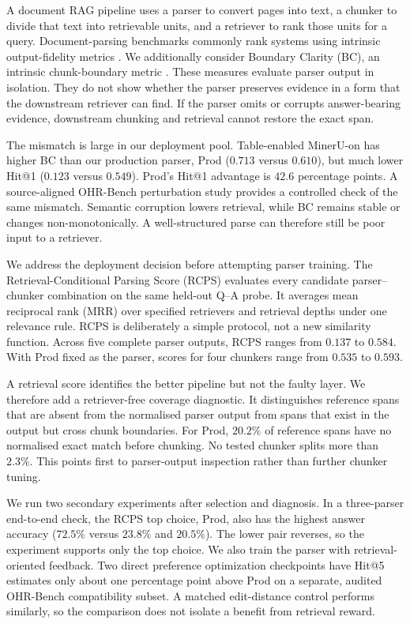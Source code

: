 \documentclass[11pt]{article}
\newcommand{\rcps}{\textnormal{\textsc{RCPS}}}
\begin{document}
A document RAG pipeline uses a parser to convert pages into text, a chunker to divide that text into retrievable units, and a retriever to rank those units for a query. Document-parsing benchmarks commonly rank systems using intrinsic output-fidelity metrics \citep{ouyang2025omnidocbench}. We additionally consider Boundary Clarity (BC), an intrinsic chunk-boundary metric \citep{zhao2025moc}. These measures evaluate parser output in isolation. They do not show whether the parser preserves evidence in a form that the downstream retriever can find. If the parser omits or corrupts answer-bearing evidence, downstream chunking and retrieval cannot restore the exact span.

The mismatch is large in our deployment pool. Table-enabled MinerU-on \citep{mineru2025} has higher BC than our production parser, Prod ($0.713$ versus $0.610$), but much lower Hit@1 ($0.123$ versus $0.549$). Prod's Hit@1 advantage is $42.6$ percentage points. A source-aligned OHR-Bench perturbation study \citep{zhang2024ohr} provides a controlled check of the same mismatch. Semantic corruption lowers retrieval, while BC remains stable or changes non-monotonically. A well-structured parse can therefore still be poor input to a retriever.

We address the deployment decision before attempting parser training. The Retrieval-Conditional Parsing Score (\rcps{}) evaluates every candidate parser--chunker combination on the same held-out Q--A probe. It averages mean reciprocal rank (MRR) over specified retrievers and retrieval depths under one relevance rule. \rcps{} is deliberately a simple protocol, not a new similarity function. Across five complete parser outputs, \rcps{} ranges from $0.137$ to $0.584$. With Prod fixed as the parser, scores for four chunkers range from $0.535$ to $0.593$.

A retrieval score identifies the better pipeline but not the faulty layer. We therefore add a retriever-free coverage diagnostic. It distinguishes reference spans that are absent from the normalised parser output from spans that exist in the output but cross chunk boundaries. For Prod, $20.2\%$ of reference spans have no normalised exact match before chunking. No tested chunker splits more than $2.3\%$. This points first to parser-output inspection rather than further chunker tuning.

We run two secondary experiments after selection and diagnosis. In a three-parser end-to-end check, the \rcps{} top choice, Prod, also has the highest answer accuracy ($72.5\%$ versus $23.8\%$ and $20.5\%$). The lower pair reverses, so the experiment supports only the top choice. We also train the parser with retrieval-oriented feedback. Two direct preference optimization checkpoints have Hit@5 estimates only about one percentage point above Prod on a separate, audited OHR-Bench compatibility subset. A matched edit-distance control performs similarly, so the comparison does not isolate a benefit from retrieval reward.
\end{document}
